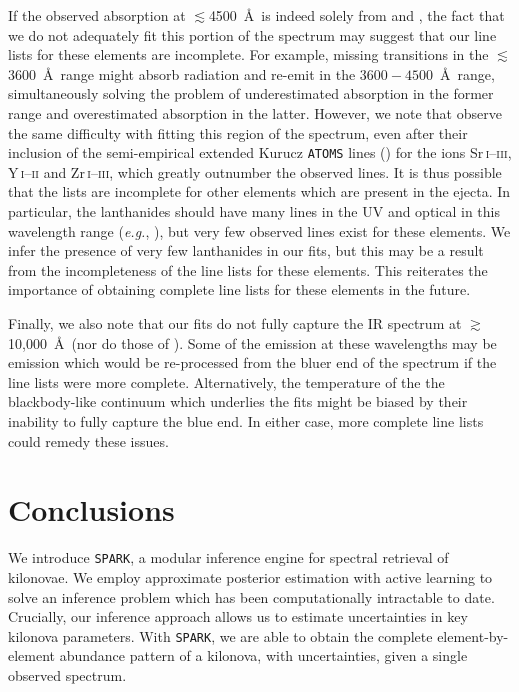 \documentclass[twocolumn, twocolappendix]{aastex63}
\def\SPARK{\texttt{SPARK}}
\def\eg{{\it e.g.}}
\begin{document}
If the observed absorption at $\lesssim$4500~\AA~is indeed solely from  and , the fact that we do not adequately fit this portion of the spectrum may suggest that our line lists for these elements are incomplete. For example, missing transitions in the $\lesssim$3600~\AA~range might absorb radiation and re-emit in the $3600 - 4500$~\AA~range, simultaneously solving the problem of underestimated absorption in the former range and overestimated absorption in the latter. However, we note that \cite{gillanders22} observe the same difficulty with fitting this region of the spectrum, even after their inclusion of the semi-empirical extended Kurucz \texttt{ATOMS} lines (\citealt{kurucz18}) for the ions \mbox{Sr\,\textsc{i}--\textsc{iii}}, \mbox{Y\,\textsc{i}--\textsc{ii}} and \mbox{Zr\,\textsc{i}--\textsc{iii}}, which greatly outnumber the observed lines. It is thus possible that the lists are incomplete for other elements which are present in the ejecta. In particular, the lanthanides should have many lines in the UV and optical in this wavelength range (\eg, \citealt{tanaka20}), but very few observed lines exist for these elements. We infer the presence of very few lanthanides in our fits, but this may be a result from the incompleteness of the line lists for these elements. This reiterates the importance of obtaining complete line lists for these elements in the future. 

Finally, we also note that our fits do not fully capture the IR spectrum at $\gtrsim$10,000~\AA~(nor do those of \citealt{gillanders22}). Some of the emission at these wavelengths may be emission which would be re-processed from the bluer end of the spectrum if the line lists were more complete. Alternatively, the temperature of the the blackbody-like continuum which underlies the fits might be biased by their inability to fully capture the blue end. In either case, more complete line lists could remedy these issues. 



\section{Conclusions}\label{sec:conclusions}

We introduce \SPARK, a modular inference engine for spectral retrieval of kilonovae. We employ approximate posterior estimation with active learning to solve an inference problem which has been computationally intractable to date. Crucially, our inference approach allows us to estimate uncertainties in key kilonova parameters. With \SPARK, we are able to obtain the complete element-by-element abundance pattern of a kilonova, with uncertainties, given a single observed spectrum. 
\end{document}
